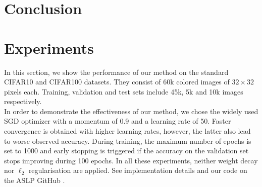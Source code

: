 \section{Conclusion}

  \section{Experiments}\label{sec:experiments}
  
  In this section, we show the performance of our method on the standard CIFAR10
  and CIFAR100 datasets.   They consist of  60k  colored images of $32\times 32$
  pixels each.  Training,  validation and test sets  include  45k,  5k and 10k
  images respectively.  \\  In order to demonstrate the effectiveness of our
  method, we chose the widely used SGD optimizer with a momentum of  0.9  and a
  learning rate of 50.    Faster convergence is obtained with higher learning
  rates,   however,  the latter also lead  to worse observed accuracy.   During
  training,  the maximum number of epochs is set to 1000 and early stopping is
  triggered  if the accuracy on the validation set stops improving during 100
  epochs.   In all these experiments, neither weight decay nor $\ell_2$
  regularisation are applied. See implementation details and our code on the ASLP GitHub
  \cite{Dupont2022}.

